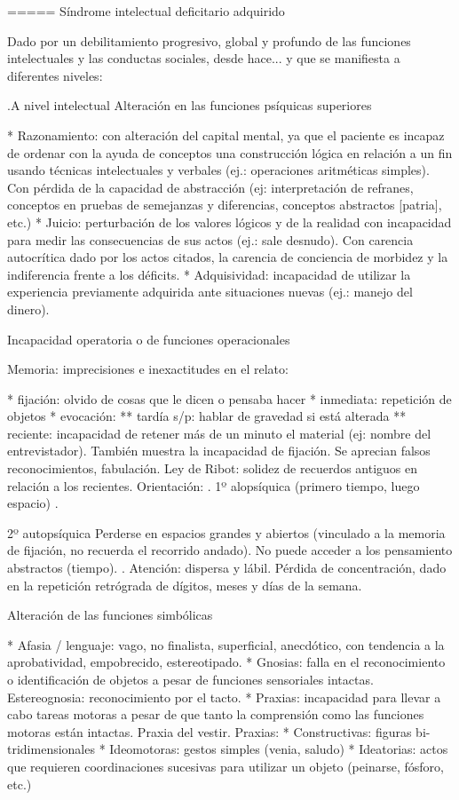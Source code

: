 ===== Síndrome intelectual deficitario adquirido

Dado por un debilitamiento progresivo, global y profundo de las funciones intelectuales y las conductas sociales, desde hace... y que se manifiesta a diferentes niveles:

.A nivel intelectual
Alteración en las funciones psíquicas superiores

* Razonamiento: con alteración del capital mental, ya que el paciente es incapaz de ordenar con la ayuda de conceptos una construcción lógica en relación a un fin usando técnicas intelectuales y verbales (ej.: operaciones aritméticas simples). Con pérdida de la capacidad de abstracción (ej: interpretación de refranes, conceptos en pruebas de semejanzas y diferencias, conceptos abstractos [patria], etc.)
* Juicio: perturbación de los valores lógicos y de la realidad con incapacidad para medir las consecuencias de sus actos (ej.: sale desnudo). Con carencia autocrítica dado por los actos citados, la carencia de conciencia de morbidez y la indiferencia frente a los déficits.
* Adquisividad: incapacidad de utilizar la experiencia previamente adquirida ante situaciones nuevas (ej.: manejo del dinero).

Incapacidad operatoria o de funciones operacionales

Memoria: imprecisiones e inexactitudes en el relato:

* fijación: olvido de cosas que le dicen o pensaba hacer
* inmediata: repetición de objetos
* evocación:
** tardía s/p: hablar de gravedad si está alterada
** reciente: incapacidad de retener más de un minuto el material (ej: nombre del entrevistador). También muestra la incapacidad de fijación. Se aprecian falsos reconocimientos, fabulación. Ley de Ribot: solidez de recuerdos antiguos en relación a los recientes. Orientación: . 1º alopsíquica (primero tiempo, luego espacio) .

2º autopsíquica Perderse en espacios grandes y abiertos (vinculado a la memoria de fijación, no recuerda el recorrido andado). No puede acceder a los pensamiento abstractos (tiempo). . Atención: dispersa y lábil. Pérdida de concentración, dado en la repetición retrógrada de dígitos, meses y días de la semana.

Alteración de las funciones simbólicas

* Afasia / lenguaje: vago, no finalista, superficial, anecdótico, con tendencia a la aprobatividad, empobrecido, estereotipado.
* Gnosias: falla en el reconocimiento o identificación de objetos a pesar de funciones sensoriales intactas. Estereognosia: reconocimiento por el tacto.
* Praxias: incapacidad para llevar a cabo tareas motoras a pesar de que tanto la comprensión como las funciones motoras están intactas. Praxia del vestir. Praxias:
* Constructivas: figuras bi-tridimensionales
* Ideomotoras: gestos simples (venia, saludo)
* Ideatorias: actos que requieren coordinaciones sucesivas para utilizar un objeto (peinarse, fósforo, etc.)

